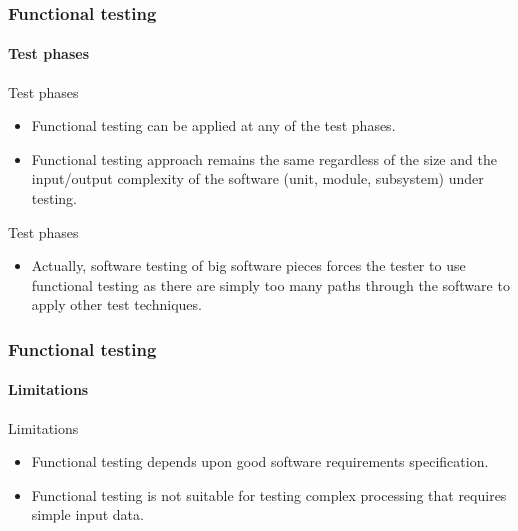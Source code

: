 \begin{frame}
\frametitle{Functional testing}
\framesubtitle{Test phases}

\begin{block:fact}{Test phases}
\begin{itemize}
	\item Functional testing can be applied at any of the test phases.

	\item Functional testing approach remains the same regardless of the size
	and the input/output complexity of the software (unit, module, subsystem)
	under testing.
\end{itemize}
\end{block:fact}


\begin{block:fact}{Test phases}
\begin{itemize}
	\item Actually, software testing of big software pieces forces the tester
	to use functional testing as there are simply too many paths through the
	software to apply other test techniques.
\end{itemize}
\end{block:fact}
\end{frame}


\begin{frame}
\frametitle{Functional testing}
\framesubtitle{Limitations}

\begin{block:fact}{Limitations}
\begin{itemize}
	\item Functional testing depends upon good software requirements
	specification.

	\item Functional testing is not suitable for testing complex processing
	that requires simple input data.
\end{itemize}
\end{block:fact}
\end{frame}



